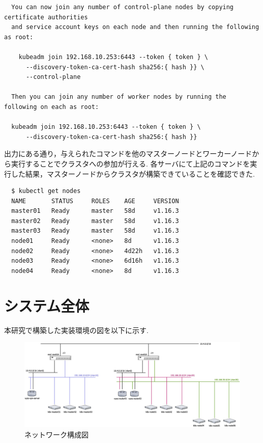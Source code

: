 \begin{lstlisting}
  You can now join any number of control-plane nodes by copying certificate authorities
  and service account keys on each node and then running the following as root:

    kubeadm join 192.168.10.253:6443 --token { token } \
      --discovery-token-ca-cert-hash sha256:{ hash }} \
      --control-plane

  Then you can join any number of worker nodes by running the following on each as root:

  kubeadm join 192.168.10.253:6443 --token { token } \
      --discovery-token-ca-cert-hash sha256:{ hash }}
\end{lstlisting}

出力にある通り，与えられたコマンドを他のマスターノードとワーカーノードから実行することでクラスタへの参加が行える.
各サーバにて上記のコマンドを実行した結果，マスターノードからクラスタが構築できていることを確認できた.

\begin{lstlisting}
  $ kubectl get nodes
  NAME       STATUS     ROLES    AGE     VERSION
  master01   Ready      master   58d     v1.16.3
  master02   Ready      master   58d     v1.16.3
  master03   Ready      master   58d     v1.16.3
  node01     Ready      <none>   8d      v1.16.3
  node02     Ready      <none>   4d22h   v1.16.3
  node03     Ready      <none>   6d16h   v1.16.3
  node04     Ready      <none>   8d      v1.16.3
\end{lstlisting}

\section{システム全体}
\label{implementation:system}
本研究で構築した実装環境の図を以下に示す.

\begin{landscape}
  \begin{figure}[htbp]
    \begin{center}
      \includegraphics[width=\textwidth]{./figures/network-diagram.jpg}
      \caption{ネットワーク構成図}
    \end{center}
  \end{figure}
\end{landscape}

